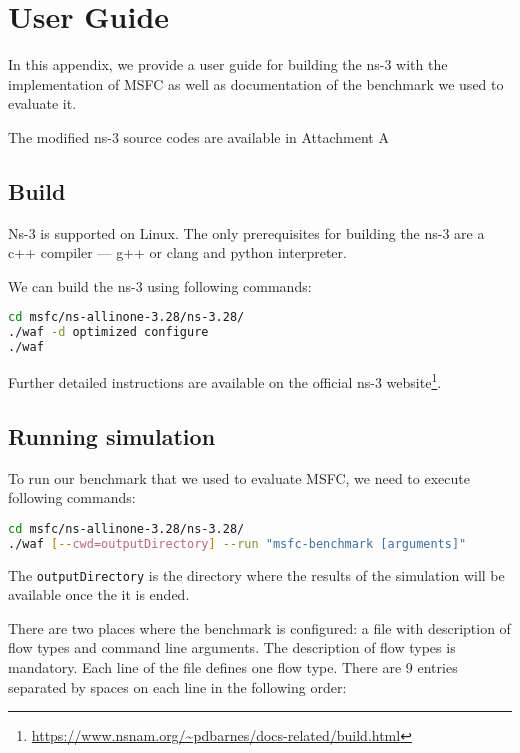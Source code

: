 \chapter{User Guide}
\label{userguide}
In this appendix, we provide a user guide for building the ns-3 with the implementation of MSFC as well as documentation of the benchmark we used to evaluate it.

The modified ns-3 source codes are available in Attachment A

\section{Build}

Ns-3 is supported on Linux. The only prerequisites for building the ns-3 are a c++ compiler --- g++ or clang and python interpreter.

We can build the ns-3 using following commands:

\begin{lstlisting}[language=bash,caption={}]
cd msfc/ns-allinone-3.28/ns-3.28/
./waf -d optimized configure
./waf
\end{lstlisting}

Further detailed instructions are available on the official ns-3 website\footnote{\url{https://www.nsnam.org/~pdbarnes/docs-related/build.html}}.

\section{Running simulation}

To run our benchmark that we used to evaluate MSFC, we need to execute following commands:

\begin{lstlisting}[language=bash,caption={}]
cd msfc/ns-allinone-3.28/ns-3.28/
./waf [--cwd=outputDirectory] --run "msfc-benchmark [arguments]"
\end{lstlisting}

The \texttt{outputDirectory} is the directory where the results of the simulation will be available once the it is ended.

There are two places where the benchmark is configured: a file with description of flow types and command line arguments. The description of flow types is mandatory. Each line of the file defines one flow type. There are 9 entries separated by spaces on each line in the following order:

